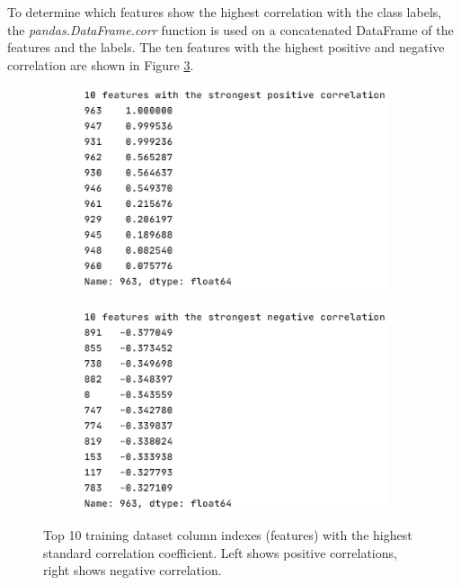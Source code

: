\documentclass[letterpaper,12pt]{article}
\begin{document}
To determine which features show the highest correlation with the class labels, the \textit{pandas.DataFrame.corr} function is used on a concatenated DataFrame of the features and the labels. The ten features with the highest positive and negative correlation are shown in Figure \ref{fig:correlation-results}.

\begin{figure}[h]
\centering
\begin{subfigure}{.49\textwidth}
  \centering
  \includegraphics[width=\textwidth]{report/figures/corr_pos.png}
  \label{fig:corr_pos}
\end{subfigure}%
\begin{subfigure}{.5\textwidth}
  \centering
  \includegraphics[width=\textwidth]{report/figures/corr_neg.png}
  \label{fig:corr_neg}
\end{subfigure}
\caption{\label{fig:correlation-results}Top 10 training dataset column indexes (features) with the highest standard correlation coefficient. Left shows positive correlations, right shows negative correlation.}
\end{figure}
\end{document}
